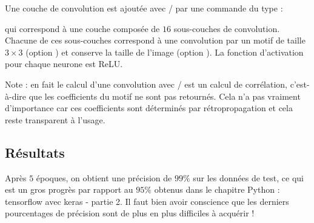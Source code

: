 \documentclass[11pt,class=report,crop=false]{standalone}
\begin{document}
Une couche de convolution est ajoutée avec \tensorflow/\keras{} par une commande du type :

qui correspond à une couche composée de $16$ sous-couches de convolution. 
Chacune de ces sous-couches correspond à une convolution par un motif de taille $3\times 3$ (option ) et conserve la taille de l'image (option ).
La fonction d'activation pour chaque neurone est \og{}ReLU\fg{}.

Note : en fait le calcul d'une \og{}convolution\fg{} avec \tensorflow/\keras{} est un calcul de corrélation, c'est-à-dire que les coefficients du motif ne sont pas retournés. Cela n'a pas vraiment d'importance car ces coefficients sont déterminés par rétropropagation et cela reste transparent à l'usage. 

\subsection{Résultats}

Après $5$ époques, on obtient une précision de $99\%$ sur les données de test, ce qui est un gros progrès par rapport au $95\%$ obtenus dans le chapitre \og{}Python : tensorflow avec keras - partie 2\fg{}. Il faut bien avoir conscience que les derniers pourcentages de précision sont de plus en plus difficiles à acquérir !
\end{document}
